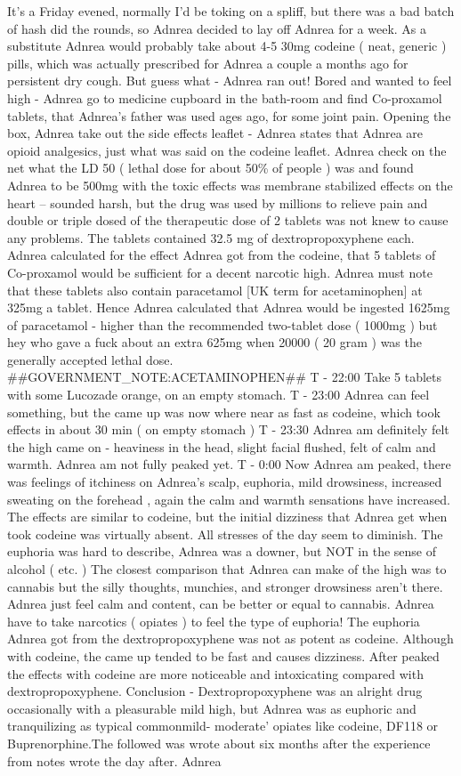 \documentclass[12pt]{book}
\begin{document}
It's a Friday evened, normally I'd be toking on a spliff, but there was a bad batch of hash did the rounds, so Adnrea decided to lay off Adnrea for a week. As a substitute Adnrea would probably take about 4-5 30mg codeine ( neat, generic ) pills, which was actually prescribed for Adnrea a couple a months ago for persistent dry cough. But guess what - Adnrea ran out! Bored and wanted to feel high - Adnrea go to medicine cupboard in the bath-room and find Co-proxamol tablets, that Adnrea's father was used ages ago, for some joint pain. Opening the box, Adnrea take out the side effects leaflet - Adnrea states that Adnrea are opioid analgesics, just what was said on the codeine leaflet. Adnrea check on the net what the LD 50 ( lethal dose for about 50\% of people ) was and found Adnrea to be 500mg with the toxic effects was membrane stabilized effects on the heart -- sounded harsh, but the drug was used by millions to relieve pain and double or triple dosed of the therapeutic dose of 2 tablets was not knew to cause any problems. The tablets contained 32.5 mg of dextropropoxyphene each. Adnrea calculated for the effect Adnrea got from the codeine, that 5 tablets of Co-proxamol would be sufficient for a decent narcotic high. Adnrea must note that these tablets also contain paracetamol [UK term for acetaminophen] at 325mg a tablet. Hence Adnrea calculated that Adnrea would be ingested 1625mg of paracetamol - higher than the recommended two-tablet dose ( 1000mg ) but hey who gave a fuck about an extra 625mg when 20000 ( 20 gram ) was the generally accepted lethal dose. \#\#GOVERNMENT\_NOTE:ACETAMINOPHEN\#\# T - 22:00 Take 5 tablets with some Lucozade orange, on an empty stomach. T - 23:00 Adnrea can feel something, but the came up was now where near as fast as codeine, which took effects in about 30 min ( on empty stomach ) T - 23:30 Adnrea am definitely felt the high came on - heaviness in the head, slight facial flushed, felt of calm and warmth. Adnrea am not fully peaked yet. T - 0:00 Now Adnrea am peaked, there was feelings of itchiness on Adnrea's scalp, euphoria, mild drowsiness, increased sweating on the forehead , again the calm and warmth sensations have increased. The effects are similar to codeine, but the initial dizziness that Adnrea get when took codeine was virtually absent. All stresses of the day seem to diminish. The euphoria was hard to describe, Adnrea was a downer, but NOT in the sense of alcohol ( etc. ) The closest comparison that Adnrea can make of the high was to cannabis but the silly thoughts, munchies, and stronger drowsiness aren't there. Adnrea just feel calm and content, can be better or equal to cannabis. Adnrea have to take narcotics ( opiates ) to feel the type of euphoria! The euphoria Adnrea got from the dextropropoxyphene was not as potent as codeine. Although with codeine, the came up tended to be fast and causes dizziness. After peaked the effects with codeine are more noticeable and intoxicating compared with dextropropoxyphene. Conclusion - Dextropropoxyphene was an alright drug occasionally with a pleasurable mild high, but Adnrea was as euphoric and tranquilizing as typical commonmild- moderate' opiates like codeine, DF118 or Buprenorphine.The followed was wrote about six months after the experience from notes wrote the day after. Adnrea 
\end{document}
